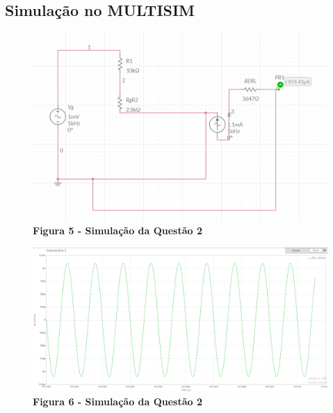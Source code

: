 \documentclass[12pt,openany,oneside,a4paper]{abntex2}
\begin{document}
\subsection{Simulação no MULTISIM}
\begin{figure}[H]
    \centering
    \includegraphics[width=1\textwidth]{Simulacao21.png}
    \large \textbf{Figura 5 - Simulação da Questão 2}
\end{figure}

\begin{figure}[H]
    \centering
    \includegraphics[width=1\textwidth]{Simulacao22.png}
    \large \textbf{Figura 6 - Simulação da Questão 2}
\end{figure}
\end{document}
